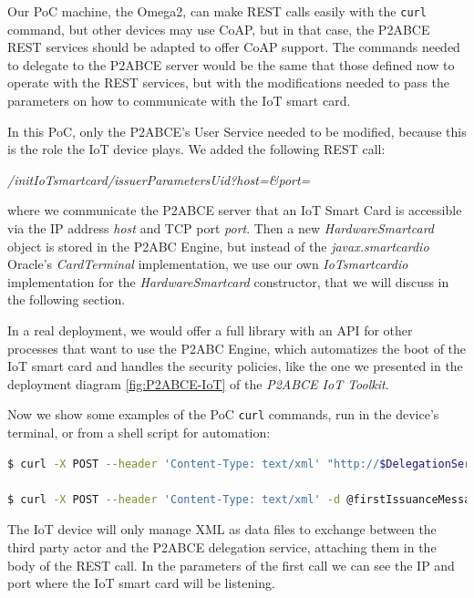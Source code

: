 \documentclass[journal]{IEEEtran}
\begin{document}
Our PoC machine, the Omega2, can make REST calls easily with the \texttt{curl} command, but other devices may use \ac{CoAP}, but in that case, the P2ABCE REST services should be adapted to offer CoAP support. The commands needed to delegate to the P2ABCE server would be the same that those defined now to operate with the REST services, but with the modifications needed to pass the parameters on how to communicate with the IoT smart card.

In this PoC, only the P2ABCE's User Service needed to be modified, because this is the role the IoT device plays. We added the following REST call:
\begin{center}
	\textit{/initIoTsmartcard/{issuerParametersUid}?host=\&port=}
\end{center}
where we communicate the P2ABCE server that an IoT Smart Card is accessible via the IP address \textit{host} and TCP port \textit{port}. Then a new \textit{HardwareSmartcard} object is stored in the P2ABC Engine, but instead of the \textit{javax.smartcardio} Oracle's \textit{CardTerminal} implementation, we use our own \textit{IoTsmartcardio} implementation for the \textit{HardwareSmartcard} constructor, that we will discuss in the following section.


\hfil

In a real deployment, we would offer a full library with an API for other processes that want to use the P2ABC Engine, which automatizes the boot of the IoT smart card and handles the security policies, like the one we presented in the deployment diagram \ref{fig:P2ABCE-IoT} of the \textit{P2ABCE IoT Toolkit}.

Now we show some examples of the PoC \texttt{curl} commands, run in the device's terminal, or from a shell script for automation:

\begin{lstlisting}[language=bash]
$ curl -X POST --header 'Content-Type: text/xml' "http://$DelegationServerIP:9200/user/initIoTsmartcard/http%3A%2F%2Fticketcompany%2FMyFavoriteSoccerTeam%2Fissuance%3Aidemix?host=192.168.3.1&port=8888"

$ curl -X POST --header 'Content-Type: text/xml' -d @firstIssuanceMessage.xml "http://$DelegationServerIP:9200/user/issuanceProtocolStep/" > issuanceReturn.xml
\end{lstlisting}

The IoT device will only manage XML as data files to exchange between the third party actor and the P2ABCE delegation service, attaching them in the body of the REST call. In the parameters of the first call we can see the IP and port where the IoT smart card will be listening.
\end{document}
